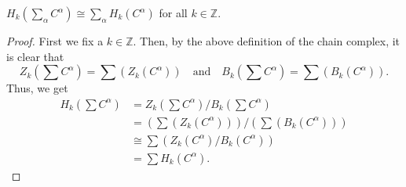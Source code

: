 \documentclass[12pt]{article}
\begin{document}
\begin{lem} \label{lem:isosumchains}
	$H_k\left(\sum_\alpha C^\alpha\right) \cong \sum_\alpha H_k(C^\alpha)$ for all $k \in \mathbb{Z}.$
\end{lem}
\begin{proof} 
	First we fix a $k \in \mathbb{Z}.$ Then, by the above definition of the chain complex, it is clear that
	\begin{equation*} 
		Z_k\left(\sum C^\alpha\right) = \sum (Z_k(C^\alpha)) \quad\text{and}\quad B_k\left(\sum C^\alpha\right) = \sum (B_k(C^\alpha)).
	\end{equation*}
	Thus, we get 
	\begin{align*}
		H_k\left(\sum C^\alpha\right) &= Z_k\left(\sum C^\alpha\right)/B_k\left(\sum C^\alpha\right)\\
		&= \left(\sum (Z_k(C^\alpha))\right)/\left(\sum (B_k(C^\alpha))\right)\\
		&\cong \sum (Z_k(C^\alpha)/B_k(C^\alpha))\\
		&= \sum H_k(C^\alpha).
	\end{align*}
\end{proof}
\end{document}
